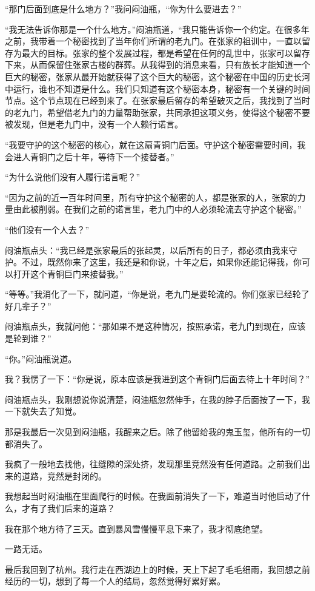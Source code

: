 “那门后面到底是什么地方？”我问闷油瓶，“你为什么要进去？”

“我无法告诉你那是一个什么地方。”闷油瓶道，“我只能告诉你一个约定。在很多年之前，我带着一个秘密找到了当年你们所谓的老九门。在张家的祖训中，一直以留存为最大的目标。张家的整个发展过程，都是希望在任何的乱世中，张家可以留存下来，从而保留住张家古楼的群葬。从我得到的消息来看，只有族长才能知道一个巨大的秘密，张家从最开始就获得了这个巨大的秘密，这个秘密在中国的历史长河中运行，谁也不知道是什么。我们只知道有这个秘密本身，秘密有一个关键的时间节点。这个节点现在已经到来了。在张家最后留存的希望破灭之后，我找到了当时的老九门，希望借老九门的力量帮助张家，共同承担这项义务，使得这个秘密不要被发现，但是老九门中，没有一个人赖行诺言。

“我要守护的这个秘密的核心，就在这扇青铜门后面。守护这个秘密需要时间，我会进人青铜门之后十年，等待下一个接替者。”

“为什么说他们没有人履行诺言呢？”

“因为之前的近一百年时间里，所有守护这个秘密的人，都是张家的人，张家的力量由此被削弱。在我们之前的诺言里，老九门中的人必须轮流去守护这个秘密。”

“他们没有一个人去？”

闷油瓶点头：“我已经是张家最后的张起灵，以后所有的日子，都必须由我来守护。不过，既然你来了这里，我还是和你说，十年之后，如果你还能记得我，你可以打开这个青铜巨门来接替我。”

“等等。”我消化了一下，就问道，“你是说，老九门是要轮流的。你们张家已经轮了好几辈子？”

闷油瓶点头，我就问他：“那如果不是这种情况，按照承诺，老九门到现在，应该是轮到谁？”

“你。”闷油瓶说道。

我？我愣了一下：“你是说，原本应该是我进到这个青铜门后面去待上十年时间？”

闷油瓶点头，我刚想说你说清楚，闷油瓶忽然伸手，在我的脖子后面按了一下，我一下就失去了知觉。

那是我最后一次见到闷油瓶，我醒来之后。除了他留给我的鬼玉玺，他所有的一切都消失了。

我疯了一般地去找他，往缝隙的深处挤，发现那里竞然没有任何道路。之前我们出来的道路，竞然是封闭的。

我想起当时闷油瓶在里面爬行的时候。在我面前消失了一下，难道当时他启动了什么，才有了我们后来的道路？

我在那个地方待了三天。直到暴风雪慢慢平息下来了，我才彻底绝望。

一路无话。

最后我回到了杭州。我行走在西湖边上的时候，天上下起了毛毛细雨，我回想之前经历的一切，想到了每一个人的结局，忽然觉得好累好累。

